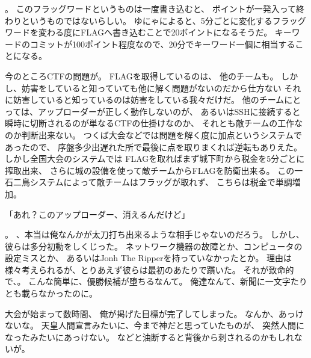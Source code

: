 。
このフラッグワードというものは一度書き込むと、
ポイントが一発入って終わりというものではないらしい。
ゆにゃによると、5分ごとに変化するフラッグワードを変わる度にFLAGへ書き込むことで20ボイントになるそうだ。
キーワードのコミットが100ポイント程度なので、20分でキーワード一個に相当することになる。

今のところCTFの問題が。
FLAGを取得しているのは、
他のチームも。
しかし、妨害をしていると知っていても他に解く問題がないのだから仕方ない%
それに妨害していると知っているのは妨害をしている我々だけだ。
他のチームにとっては、アップローダーが正しく動作しないのが、
あるいはSSHに接続すると瞬時に切断されるのが単なるCTFの仕掛けなのか、
それとも敵チームの工作なのか判断出来ない。
つくば大会などでは問題を解く度に加点というシステムであったので、
序盤多少出遅れた所で最後に点を取りまくれば逆転もありえた。
しかし全国大会のシステムでは%
FLAGを取ればまず城下町から税金を5分ごとに搾取出来、
さらに城の設備を使って敵チームからFLAGを防衛出来る。
この一石二鳥システムによって敵チームはフラッグが取れず、
こちらは税金で単調増加。

「あれ？このアップローダー、消えるんだけど」

。
、本当は俺なんかが太刀打ち出来るような相手じゃないのだろう。
しかし、彼らは多分初動をしくじった。
ネットワーク機器の故障とか、コンピュータの設定ミスとか、
あるいはJonh The Ripperを持っていなかったとか。
理由は様々考えられるが、とりあえず彼らは最初のあたりで躓いた。
それが致命的で、。
こんな簡単に、優勝候補が堕ちるなんて。
俺達なんて、新聞に一文字たりとも載らなかったのに。

大会が始まって数時間、
俺が掲げた目標が完了してしまった。
なんか、あっけないな。
天皇人間宣言みたいに、今まで神だと思っていたものが、
突然人間になったみたいにあっけない。
などと油断すると背後から刺されるのかもしれないが。


